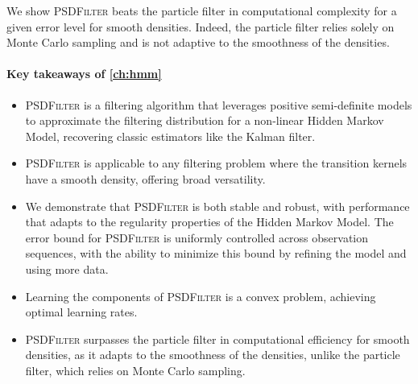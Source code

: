 We show \textsc{PSDFilter} beats the particle filter in computational complexity for a given error level for smooth densities. Indeed, the particle filter relies solely on Monte Carlo sampling and is not adaptive to the smoothness of the densities.
\paragraph{Key takeaways of \cref{ch:hmm}}
\begin{itemize}
    \item \textsc{PSDFilter} is a filtering algorithm that leverages positive semi-definite models to approximate the filtering distribution for a non-linear Hidden Markov Model, recovering classic estimators like the Kalman filter.
    \item \textsc{PSDFilter} is applicable to any filtering problem where the transition kernels have a smooth density, offering broad versatility.
    \item We demonstrate that \textsc{PSDFilter} is both stable and robust, with performance that adapts to the regularity properties of the Hidden Markov Model. The error bound for \textsc{PSDFilter} is uniformly controlled across observation sequences, with the ability to minimize this bound by refining the model and using more data.
    \item Learning the components of \textsc{PSDFilter} is a convex problem, achieving optimal learning rates.
    \item \textsc{PSDFilter} surpasses the particle filter in computational efficiency for smooth densities, as it adapts to the smoothness of the densities, unlike the particle filter, which relies on Monte Carlo sampling.
\end{itemize}
